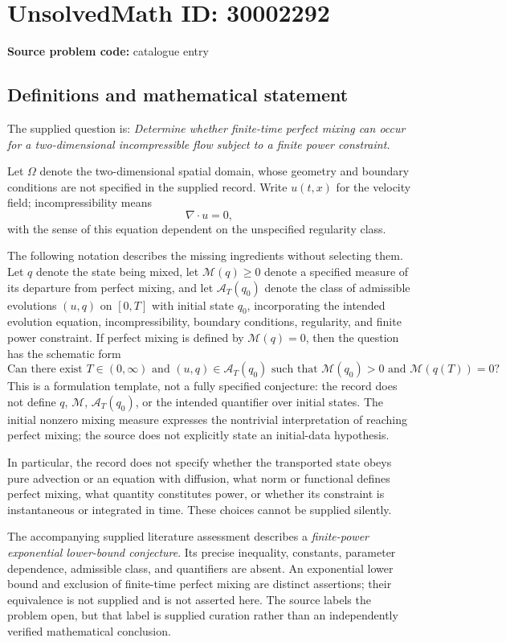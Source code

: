 \documentclass[11pt]{article}
\begin{document}
\section*{UnsolvedMath ID: 30002292}
\textbf{Source problem code:} catalogue entry
\subsection{Definitions and mathematical statement}
The supplied question is: \emph{Determine whether finite-time perfect mixing can occur for a two-dimensional incompressible flow subject to a finite power constraint.}

Let \(\Omega\) denote the two-dimensional spatial domain, whose geometry and boundary conditions are not specified in the supplied record. Write \(u(t,x)\) for the velocity field; incompressibility means
\[
\nabla\cdot u=0,
\]
with the sense of this equation dependent on the unspecified regularity class.

The following notation describes the missing ingredients without selecting them. Let \(q\) denote the state being mixed, let \(\mathcal M(q)\geq 0\) denote a specified measure of its departure from perfect mixing, and let \(\mathcal A_T(q_0)\) denote the class of admissible evolutions \((u,q)\) on \([0,T]\) with initial state \(q_0\), incorporating the intended evolution equation, incompressibility, boundary conditions, regularity, and finite power constraint. If perfect mixing is defined by \(\mathcal M(q)=0\), then the question has the schematic form
\[
\text{Can there exist }T\in(0,\infty)
\text{ and }(u,q)\in\mathcal A_T(q_0)
\text{ such that }\mathcal M(q_0)>0
\text{ and }\mathcal M(q(T))=0?
\]
This is a formulation template, not a fully specified conjecture: the record does not define \(q\), \(\mathcal M\), \(\mathcal A_T(q_0)\), or the intended quantifier over initial states. The initial nonzero mixing measure expresses the nontrivial interpretation of reaching perfect mixing; the source does not explicitly state an initial-data hypothesis.

In particular, the record does not specify whether the transported state obeys pure advection or an equation with diffusion, what norm or functional defines perfect mixing, what quantity constitutes power, or whether its constraint is instantaneous or integrated in time. These choices cannot be supplied silently.

The accompanying supplied literature assessment describes a \emph{finite-power exponential lower-bound conjecture}. Its precise inequality, constants, parameter dependence, admissible class, and quantifiers are absent. An exponential lower bound and exclusion of finite-time perfect mixing are distinct assertions; their equivalence is not supplied and is not asserted here. The source labels the problem open, but that label is supplied curation rather than an independently verified mathematical conclusion.
\end{document}
